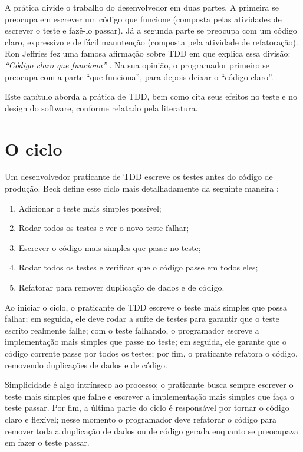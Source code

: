 A prática divide o trabalho do desenvolvedor em duas partes.
A primeira se preocupa em escrever um código que funcione (composta pelas
atividades de escrever o teste e fazê-lo passar). Já a segunda parte se preocupa
com um código claro, expressivo e de fácil manutenção (composta pela atividade
de refatoração). Ron Jeffries fez uma famosa afirmação sobre TDD em que explica
essa divisão: \textit{``Código claro que funciona''} \cite{TDDByExample}. Na
sua opinião, o programador primeiro se preocupa com a parte ``que funciona'', 
para depois deixar o ``código claro''.

Este capítulo aborda a prática de TDD, bem como cita
seus efeitos no teste e no design do software, conforme relatado pela
literatura.

\section{O ciclo}

Um desenvolvedor praticante de TDD escreve os testes antes do código de
produção. Beck define esse ciclo mais detalhadamente da seguinte maneira
\cite{TDDByExample}:

\begin{enumerate}
	\item Adicionar o teste mais simples possível; 
	\item Rodar todos os testes e ver o novo teste falhar; 
	\item Escrever o código mais simples que passe no teste; 
	\item Rodar todos os testes e verificar que o código passe em todos eles; 
	\item Refatorar para remover duplicação de dados e de código.
\end{enumerate}

Ao iniciar o ciclo, o praticante de TDD escreve o teste mais simples que
possa falhar; em seguida, ele deve rodar a suíte de testes para 
garantir que o teste escrito realmente falhe; 
com o teste falhando, o programador escreve a
implementação mais simples que passe no teste; em
seguida, ele garante que o código corrente passe por todos os testes; por fim, o praticante
refatora o código, removendo duplicações de dados e de código.

Simplicidade é algo intrínseco ao processo; o praticante
busca sempre escrever o teste mais simples que falhe e escrever a implementação mais simples
que faça o teste passar. Por fim, a última parte do ciclo é responsável por
tornar o código claro e flexível; nesse momento o programador deve
refatorar o código para remover toda a duplicação de dados ou de código gerada enquanto 
se preocupava em fazer o teste passar.

